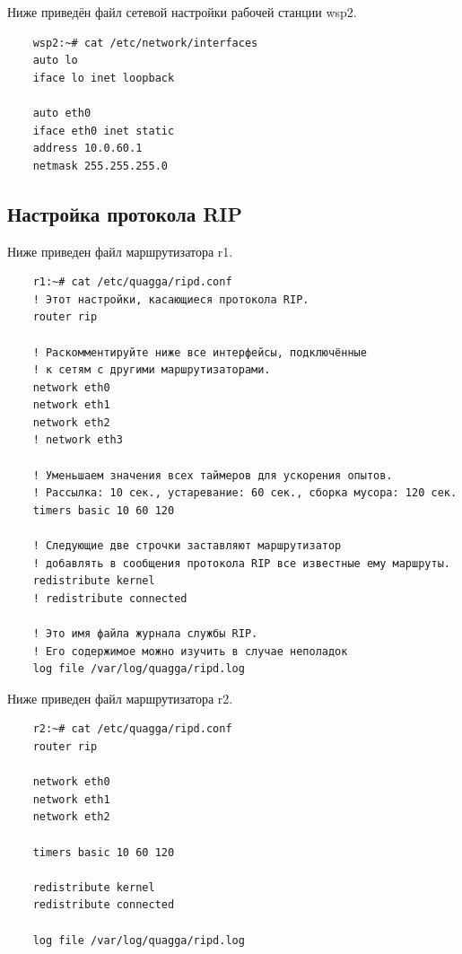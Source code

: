 \documentclass[a4paper,12pt]{article}
\begin{document}
Ниже приведён файл сетевой настройки рабочей станции wsp2.

\begin{Verbatim}
    wsp2:~# cat /etc/network/interfaces 
    auto lo
    iface lo inet loopback
    
    auto eth0
    iface eth0 inet static
    address 10.0.60.1
    netmask 255.255.255.0    
\end{Verbatim}



\subsection{Настройка протокола RIP}

Ниже приведен файл  маршрутизатора r1.

\begin{Verbatim}
    r1:~# cat /etc/quagga/ripd.conf
    ! Этот настройки, касающиеся протокола RIP.
    router rip
    
    ! Раскомментируйте ниже все интерфейсы, подключённые
    ! к сетям с другими маршрутизаторами.
    network eth0
    network eth1
    network eth2
    ! network eth3
    
    ! Уменьшаем значения всех таймеров для ускорения опытов.
    ! Рассылка: 10 сек., устаревание: 60 cек., сборка мусора: 120 сек.
    timers basic 10 60 120
    
    ! Следующие две строчки заставляют маршрутизатор
    ! добавлять в сообщения протокола RIP все известные ему маршруты.
    redistribute kernel
    ! redistribute connected
    
    ! Это имя файла журнала службы RIP.
    ! Его содержимое можно изучить в случае неполадок
    log file /var/log/quagga/ripd.log
\end{Verbatim}

Ниже приведен файл  маршрутизатора r2.

\begin{Verbatim}
    r2:~# cat /etc/quagga/ripd.conf
    router rip
    
    network eth0
    network eth1
    network eth2
    
    timers basic 10 60 120

    redistribute kernel
    redistribute connected
    
    log file /var/log/quagga/ripd.log
    
\end{Verbatim}
\end{document}
